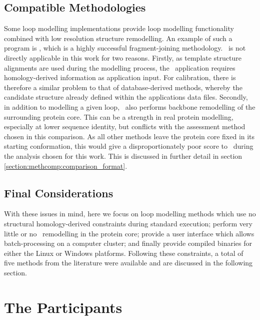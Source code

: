 \subsection{Compatible Methodologies}

Some loop modelling implementations provide loop modelling functionality combined with low resolution structure remodelling.  An example of such a program is \rosetta\cite{METHOD:Rosetta}, which is a highly successful fragment-joining
methodology. \rosetta\  is  not directly applicable in this work for two reasons. Firstly, as template
structure alignments are used during the modelling process, the \rosetta\  application requires homology-derived information as application input. For calibration, there is therefore a similar problem to that of database-derived methods,
whereby the candidate structure already defined within the applications data
files. Secondly, in addition to modelling a given loop, \rosetta\ also performs backbone remodelling of the surrounding protein core. This can be a strength in real protein modelling, especially at lower sequence identity, but conflicts with the assessment method chosen in this comparison.
As all other methods leave the protein core fixed in its starting conformation, this would give a disproportionately poor score to \rosetta\ during the analysis chosen for this work.  This is discussed in further detail in section \ref{section:methcomp:comparison_format}.

\subsection{Final Considerations}

With these issues in mind, here we focus on loop modelling methods which use no structural homology-derived constraints during standard execution; perform very little or no \mainchain\ remodelling in the protein core; provide a user interface which allows batch-processing on a computer cluster; and finally provide compiled binaries for either the Linux or Windows platforms. Following these constraints, a total of five methods from the literature were available and are discussed in the following section.









\section{The Participants}


